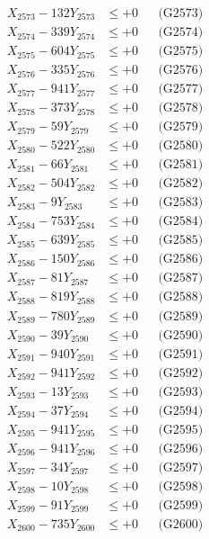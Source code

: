 \documentclass[a4paper,10pt]{article}
\begin{document}
{\begin{align}
X_{2573} - 132Y_{2573} &\leq +0 && \text{(G2573)} \\
X_{2574} - 339Y_{2574} &\leq +0 && \text{(G2574)} \\
X_{2575} - 604Y_{2575} &\leq +0 && \text{(G2575)} \\
X_{2576} - 335Y_{2576} &\leq +0 && \text{(G2576)} \\
X_{2577} - 941Y_{2577} &\leq +0 && \text{(G2577)} \\
X_{2578} - 373Y_{2578} &\leq +0 && \text{(G2578)} \\
X_{2579} - 59Y_{2579} &\leq +0 && \text{(G2579)} \\
X_{2580} - 522Y_{2580} &\leq +0 && \text{(G2580)} \\
\allowbreak
X_{2581} - 66Y_{2581} &\leq +0 && \text{(G2581)} \\
X_{2582} - 504Y_{2582} &\leq +0 && \text{(G2582)} \\
X_{2583} - 9Y_{2583} &\leq +0 && \text{(G2583)} \\
X_{2584} - 753Y_{2584} &\leq +0 && \text{(G2584)} \\
X_{2585} - 639Y_{2585} &\leq +0 && \text{(G2585)} \\
X_{2586} - 150Y_{2586} &\leq +0 && \text{(G2586)} \\
X_{2587} - 81Y_{2587} &\leq +0 && \text{(G2587)} \\
X_{2588} - 819Y_{2588} &\leq +0 && \text{(G2588)} \\
X_{2589} - 780Y_{2589} &\leq +0 && \text{(G2589)} \\
X_{2590} - 39Y_{2590} &\leq +0 && \text{(G2590)} \\
\allowbreak
X_{2591} - 940Y_{2591} &\leq +0 && \text{(G2591)} \\
X_{2592} - 941Y_{2592} &\leq +0 && \text{(G2592)} \\
X_{2593} - 13Y_{2593} &\leq +0 && \text{(G2593)} \\
X_{2594} - 37Y_{2594} &\leq +0 && \text{(G2594)} \\
X_{2595} - 941Y_{2595} &\leq +0 && \text{(G2595)} \\
X_{2596} - 941Y_{2596} &\leq +0 && \text{(G2596)} \\
X_{2597} - 34Y_{2597} &\leq +0 && \text{(G2597)} \\
X_{2598} - 10Y_{2598} &\leq +0 && \text{(G2598)} \\
X_{2599} - 91Y_{2599} &\leq +0 && \text{(G2599)} \\
X_{2600} - 735Y_{2600} &\leq +0 && \text{(G2600)} \\

\end{align}}
\end{document}

